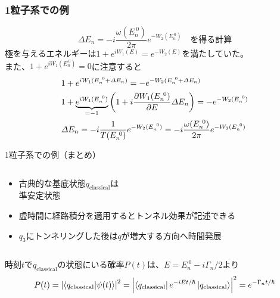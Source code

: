 \documentclass[14pt,aspectratio=169,xcolor=dvipsnames,table,dvipdfmx]{beamer}
\theoremstyle{definition}
\begin{document}
\begin{frame}
  \frametitle{1粒子系での例}
  \begin{equation*}
    \varDelta E_n = -i\frac{\omega(E_n^{~0})}{2\pi}e^{-W_2(E_n^{~0})}\quad\text{を得る計算}
  \end{equation*}
  極を与えるエネルギーは$1+e^{iW_1(E)}=e^{-W_2(E)}$を満たしていた。\\
  また、$1+e^{iW_1(E_n^{~0})}=0$に注意すると
  \begin{align*}
     & 1+e^{iW_1(E_n^{~0}+\varDelta E_n)}=-e^{-W_2(E_n^{~0}+\varDelta E_n)}                                          \\
     & 1+\underbrace{e^{iW_1(E_n^{~0})}}_{=-1}\qty(1+i\pdv{W_1(E_n^{~0})}{E}\varDelta E_n) = -e^{-W_2(E_n^{~0})}     \\
     & \varDelta E_n = -i\frac{1}{T(E_n^{~0})}e^{-W_2(E_n^{~0})} = -i\frac{\omega(E_n^{~0})}{2\pi}e^{-W_2(E_n^{~0})}
  \end{align*}



\end{frame}

\begin{frame}{1粒子系での例（まとめ）}
  \begin{columns}[t]
    \begin{column}{.5\textwidth}
      \begin{itemize}
        \item 古典的な基底状態$q_{\text{classical}}$は\\準安定状態
        \item 虚時間に経路積分を適用するとトンネル効果が記述できる
        \item $q_3$にトンネリングした後は$q$が増大する方向へ時間発展
      \end{itemize}
    \end{column}
    \begin{column}{.5\textwidth}
    \end{column}
  \end{columns}
  時刻$t$で$q_{\text{classical}}$の状態にいる確率$P(t)$は、$E=E_n^{~0}-i\Gamma_n/2$より
  \begin{equation*}
    P(t) = \abs{\braket{q_{\text{classical}}}{\psi(t)}}^2 = \abs{\bra{q_{\text{classical}}}e^{-iEt/\hbar}\ket{q_{\text{classical}}}}^2 = e^{-\Gamma_nt/\hbar}
  \end{equation*}
\end{frame}
\end{document}
